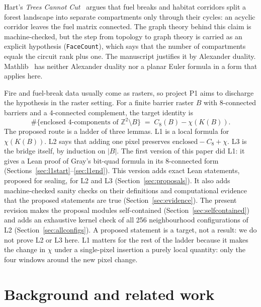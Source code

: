 \documentclass[11pt]{article}
\theoremstyle{definition}
\theoremstyle{remark}
\begin{document}
Hart's \emph{Trees Cannot Cut}~\cite{Hart2026} argues that fuel breaks and
habitat corridors split a forest landscape into separate compartments only
through their cycles: an acyclic corridor leaves the fuel matrix connected. The
graph theory behind this claim is machine-checked, but the step from topology to
graph theory is carried as an explicit hypothesis (\texttt{FaceCount}), which
says that the number of compartments equals the circuit rank plus one. The
manuscript justifies it by Alexander duality. Mathlib~\cite{Mathlib2020} has
neither Alexander duality nor a planar Euler formula in a form that applies
here.

Fire and fuel-break data usually come as rasters, so project P1 aims to
discharge the hypothesis in the raster setting. For a finite barrier raster $B$
with 8-connected barriers and a 4-connected complement, the target identity is
\[
  \#\{\text{enclosed 4-components of } \mathbb{Z}^2\setminus B\}
  \;=\; C_8(B) - \chi(K(B)).
\]
The proposed route is a ladder of three lemmas. L1 is a local formula for
$\chi(K(B))$. L2 says that adding one pixel preserves
$\text{enclosed} - C_8 + \chi$. L3 is the bridge itself, by induction on $|B|$.
The first version of this paper did L1: it gives a Lean proof of Gray's
bit-quad formula in its 8-connected form (Sections~\ref{sec:l1start}--\ref{sec:l1end}).
This version adds exact Lean statements, proposed for sealing, for L2 and L3
(Section~\ref{sec:proposals}). It also adds machine-checked sanity checks on
their definitions and computational evidence that the proposed statements are
true (Section~\ref{sec:evidence}). The present revision makes the proposal
modules self-contained (Section~\ref{sec:selfcontained}) and adds an exhaustive
kernel check of all 256 neighbourhood configurations of L2
(Section~\ref{sec:allconfigs}). A proposed statement is a target, not a
result: we do not prove L2 or L3 here. L1 matters for the rest of the ladder because it makes the
change in $\chi$ under a single-pixel insertion a purely local quantity: only
the four windows around the new pixel change.

\section{Background and related work}
\end{document}
